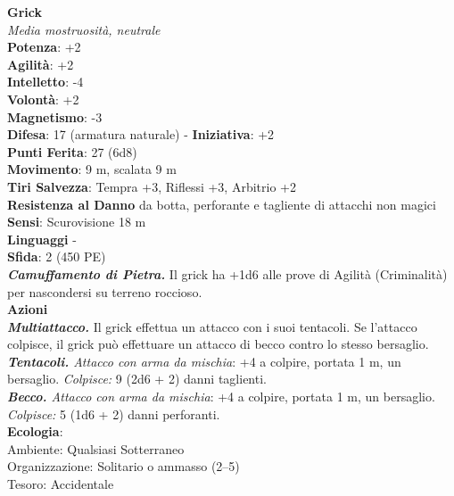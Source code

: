 \begin{multicols}{2}
\medskip\textbf{Grick}\\
\emph{Media mostruosità, neutrale}\\
\textbf{Potenza}: +2\\
\textbf{Agilità}: +2\\
\textbf{Intelletto}: -4\\
\textbf{Volontà}: +2\\
\textbf{Magnetismo}: -3\\
\textbf{Difesa}: 17 (armatura naturale) - \textbf{Iniziativa}: +2\\
\textbf{Punti Ferita}: 27 (6d8)\\
\textbf{Movimento}: 9 m, scalata 9 m\\
\textbf{Tiri Salvezza}: Tempra +3, Riflessi +3, Arbitrio +2\\
\textbf{Resistenza al Danno} da botta, perforante e tagliente di attacchi non magici\\
\textbf{Sensi}: Scurovisione 18 m\\
\textbf{Linguaggi} -\\
\textbf{Sfida}: 2 (450 PE)\smallskip\\
\emph{\textbf{Camuffamento di Pietra.}} Il grick ha +1d6 alle prove di Agilità (Criminalità) per nascondersi su terreno roccioso.\\
\smallskip\textbf{Azioni}\\
\emph{\textbf{Multiattacco.}} Il grick effettua un attacco con i suoi tentacoli. Se l'attacco colpisce, il grick può effettuare un attacco di becco contro lo stesso bersaglio.\\
\emph{\textbf{Tentacoli.} Attacco con arma da mischia}: +4 a colpire, portata 1 m, un bersaglio.
\emph{Colpisce:} 9 (2d6 + 2) danni taglienti.\\
\emph{\textbf{Becco.} Attacco con arma da mischia}: +4 a colpire, portata 1 m, un bersaglio.
\emph{Colpisce:} 5 (1d6 + 2) danni perforanti.\\
\textbf{Ecologia}: \\
Ambiente: Qualsiasi Sotterraneo\\
Organizzazione: Solitario o ammasso (2–5)\\
Tesoro: Accidentale\\


\end{multicols}
